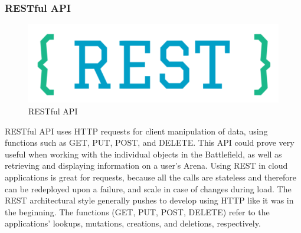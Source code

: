 \documentclass[12pt,a4paper]{report}
\begin{document}
			\subsubsection{RESTful API}
			\begin{figure}
				\includegraphics[scale=0.3]{restful}
				\caption{RESTful API}
				\label{fig: RESTful API)}
			\end{figure}
			RESTful API uses HTTP requests for client manipulation of data, using functions such as GET, PUT, POST, and DELETE. This API could prove very useful when working with the individual objects in the Battlefield, as well as retrieving and displaying information on a user's Arena. Using REST in cloud applications is great for requests, because all the calls are stateless and therefore can be redeployed upon a failure, and scale in case of changes during load. The REST architectural style generally pushes to develop using HTTP like it was in the beginning. The functions (GET, PUT, POST, DELETE) refer to the applications' lookups, mutations, creations, and deletions, respectively.
			\newpage
\end{document}
